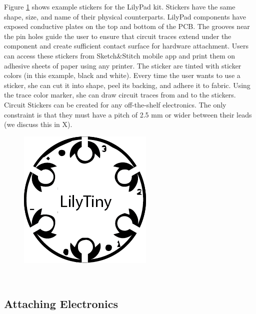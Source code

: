 \documentclass[header.tex]{subfiles}
\begin{document}
Figure \ref{fig:BlackStickers} shows example stickers for the LilyPad kit. Stickers have the same shape, size, and name of their physical counterparts. LilyPad components have exposed conductive plates on the top and bottom of the PCB. The grooves near the pin holes guide the user to ensure that circuit traces extend under the component and create sufficient contact surface for hardware attachment. Users can access these stickers from Sketch\&Stitch mobile app and print them on adhesive sheets of paper using any printer. The sticker are tinted with sticker colors (in this example, black and white). Every time the user wants to use a sticker, she can cut it into shape, peel its backing, and adhere it to fabric. Using the trace color marker, she can draw circuit traces from and to the stickers. 
Circuit Stickers can be created for any off-the-shelf electronics. The only constraint is that they must have a pitch of 2.5 mm or wider between their leads (we discuss this in X). 


\begin{figure} [h!]
\centering
  \includegraphics[width=0.5\columnwidth]{figures/BlackStickers}
  \caption{}~\label{fig:BlackStickers}
  \vspace{-2.5em}
\end{figure}

\subsection{Attaching Electronics}
\end{document}

